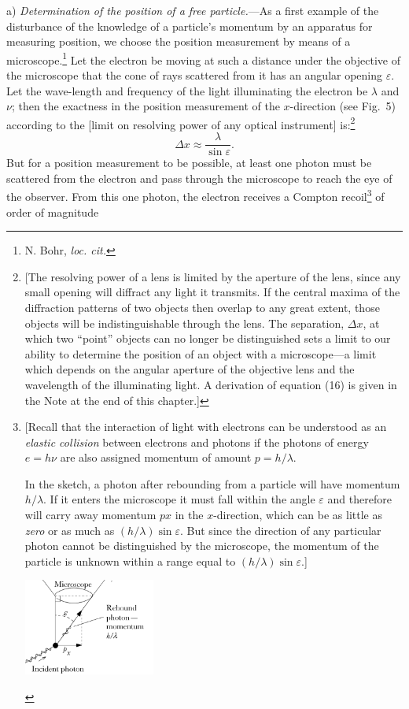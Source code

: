a) \emph{Determination of the position of a free particle.}---As a first
example of the disturbance of the knowledge of a particle's momentum by an
apparatus for measuring position, we choose the position measurement by
means of a microscope.\footnote{N. Bohr, \emph{loc. cit.}} Let the
electron be moving at such a distance under the objective of the
microscope that the cone of rays scattered from it has an angular
opening $\varepsilon$. Let the wave-length and frequency of the light
illuminating the electron be $\lambda$ and $\nu$; then the exactness
in the position measurement of the $x$-direction (see Fig.\ 5)
according to the {[}limit on resolving power of any optical
instrument{]} is:\footnote{{[}The resolving power of a lens is limited
  by the aperture of the lens, since any small opening will diffract any
  light it transmits. If the central maxima of the diffraction patterns
  of two objects then overlap to any great extent, those objects will be
  indistinguishable through the lens. The separation, $\Delta x$, at
  which two ``point'' objects can no longer be distinguished sets a
  limit to our ability to determine the position of an object with a
  microscope---a limit which depends on the angular aperture of the
  objective lens and the wavelength of the illuminating light. A
  derivation of equation (16) is given in the Note at the end of this chapter.{]}}
%
\begin{equation*}\tag{16}
\Delta x \approx \frac{\lambda}{\sin \varepsilon} .
\end{equation*}
%
But for a position measurement to be possible, at least one photon must
be scattered from the electron and pass through the microscope to reach
the eye of the observer. From this one photon, the electron receives a
Compton recoil\footnote{{[}Recall that the interaction of light
  with electrons can be understood as an \emph{elastic collision}
  between electrons and photons if the photons of energy
  $e= h\nu$ are also assigned momentum of amount $p = h/\lambda$.

  In the sketch, a photon after rebounding from a particle will have
  momentum $h/\lambda$. If it enters the microscope it must fall
  within the angle $\varepsilon$ and therefore will carry away momentum
  $px$ in the $x$-direction, which can be as little as
  \emph{zero} or as much as $(h/\lambda)\sin \varepsilon$. But since the
  direction of any particular photon cannot be distinguished by the
  microscope, the momentum of the particle is unknown within a range
  equal to $(h/\lambda)\sin \varepsilon$.{]}
  \begin{center}
    \includegraphics[width=1.7in,height=1.24667in]{images/10_heisenberg/image054.png}
  \end{center}
  } of order of magnitude
